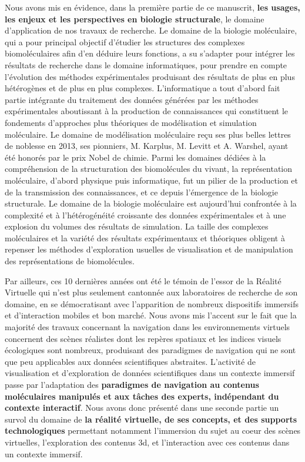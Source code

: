 Nous avons mis en évidence, dans la première partie de ce manuscrit, \textbf{les usages, les enjeux et les perspectives en biologie structurale}, le domaine d'application de nos travaux de recherche. Le domaine de la biologie moléculaire, qui a pour principal objectif d'étudier les structures des complexes biomoléculaires afin d'en déduire leurs fonctions, a su s'adapter pour intégrer les résultats de recherche dans le domaine informatiques, pour prendre en compte l'évolution des méthodes expérimentales produisant des résultats de plus en plus hétérogènes et de plus en plus complexes. L'informatique a tout d'abord fait partie intégrante du traitement des données générées par les méthodes expérimentales aboutissant à la production de connaissances qui constituent le fondements d'approches plus théoriques de modélisation et simulation moléculaire. Le domaine de modélisation moléculaire reçu ses plus belles lettres de noblesse en 2013, ses pionniers, M. Karplus, M. Levitt et A. Warshel, ayant été honorés par le prix Nobel de chimie.  Parmi les domaines dédiées à la compréhension de la structuration des biomolécules du vivant, la représentation moléculaire, d'abord physique puis informatique, fut un pilier de la production et de la transmission des connaissances, et ce depuis l'émergence de la biologie structurale. Le domaine de la biologie moléculaire est aujourd'hui confrontée à la complexité et à l'hétérogénéité croissante des données expérimentales et à une explosion du volumes des résultats de simulation. La taille des complexes moléculaires et la variété des résultats expérimentaux et théoriques obligent à repenser les méthodes d'exploration usuelles de visualisation et de manipulation des représentations de biomolécules.


Par ailleurs, ces 10 dernières années ont été le témoin de l'essor de la Réalité Virtuelle qui n'est plus seulement cantonnée aux laboratoires de recherche de son domaine, en se démocratisant avec l'apparition de nombreux dispositifs immersifs et d'interaction mobiles et bon marché. Nous avons mis l'accent sur le fait que la majorité des travaux concernant la navigation dans les environnements virtuels concernent des scènes réalistes dont les repères spatiaux et les indices visuels écologiques sont nombreux, produisant des paradigmes de navigation qui ne sont que peu applicables aux données scientifiques abstraites. L'activité de visualisation et d'exploration de données scientifiques dans un contexte immersif passe par l'adaptation des \textbf{paradigmes de navigation au contenus moléculaires manipulés et aux tâches des experts, indépendant du contexte interactif}.  Nous avons donc présenté dans une seconde partie un survol du domaine de \textbf{la réalité virtuelle, de ses concepts, et des supports technologiques} permettant notamment l'immersion du sujet au coeur des scènes virtuelles, l'exploration des contenus 3d, et l'interaction avec ces contenus dans un contexte immersif.


